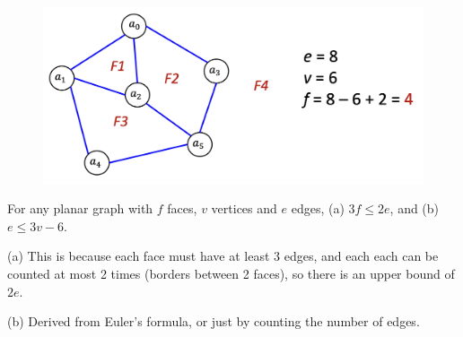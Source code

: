 \documentclass{article}
\begin{document}
\begin{description}
	\begin{figure}[H]
		\centering
		\includegraphics[scale=0.4]{eulers_formula}
	\end{figure}
	\item[Proof (Tutorial 11 Q2)] For any planar graph with $f$ faces, $v$ vertices and $e$ edges, (a) $3f\leq 2e$, and (b) $e\leq 3v-6$.
	\item \qquad (a) This is because each face must have at least 3 edges, and each each can be counted at most 2 times (borders between 2 faces), so there is an upper bound of $2e$.
	\item \qquad (b) Derived from Euler's formula, or just by counting the number of edges.
	

\end{description}
\end{document}
